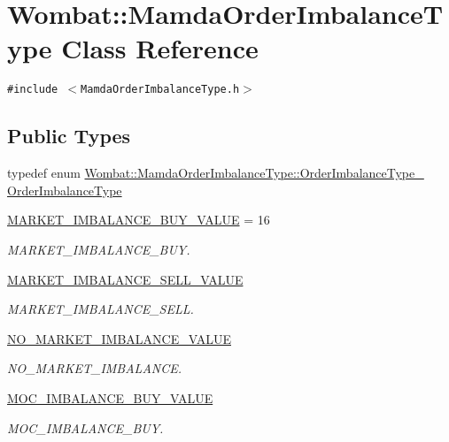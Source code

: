 \hypertarget{classWombat_1_1MamdaOrderImbalanceType}{
\section{Wombat::Mamda\-Order\-Imbalance\-Type Class Reference}
\label{classWombat_1_1MamdaOrderImbalanceType}
}
{\tt \#include $<$Mamda\-Order\-Imbalance\-Type.h$>$}

\subsection*{Public Types}
\begin{CompactItemize}
\item 
typedef enum \hyperlink{classWombat_1_1MamdaOrderImbalanceType_1d6586915356b2aa4c6931591f172c14}{Wombat::Mamda\-Order\-Imbalance\-Type::Order\-Imbalance\-Type\_\-} \hyperlink{classWombat_1_1MamdaOrderImbalanceType_370ce0bab0cc5de6c2452408a1abb6d1}{Order\-Imbalance\-Type}
\item 
\hyperlink{classWombat_1_1MamdaOrderImbalanceType_1d6586915356b2aa4c6931591f172c1474847d51501d125a7d5932dcc295d702}{MARKET\_\-IMBALANCE\_\-BUY\_\-VALUE} = 16
\begin{CompactList}\small\item\em MARKET\_\-IMBALANCE\_\-BUY. \item\end{CompactList}\item 
\hyperlink{classWombat_1_1MamdaOrderImbalanceType_1d6586915356b2aa4c6931591f172c14f711ad219da3f908647a95db038a8d49}{MARKET\_\-IMBALANCE\_\-SELL\_\-VALUE}
\begin{CompactList}\small\item\em MARKET\_\-IMBALANCE\_\-SELL. \item\end{CompactList}\item 
\hyperlink{classWombat_1_1MamdaOrderImbalanceType_1d6586915356b2aa4c6931591f172c145ff2b46c7864880a48693d69a1297319}{NO\_\-MARKET\_\-IMBALANCE\_\-VALUE}
\begin{CompactList}\small\item\em NO\_\-MARKET\_\-IMBALANCE. \item\end{CompactList}\item 
\hyperlink{classWombat_1_1MamdaOrderImbalanceType_1d6586915356b2aa4c6931591f172c14c4cc06c4366c3e4162b4317adc7c5ac6}{MOC\_\-IMBALANCE\_\-BUY\_\-VALUE}
\begin{CompactList}\small\item\em MOC\_\-IMBALANCE\_\-BUY. \item\end{CompactList}\item 

\end{CompactItemize}
